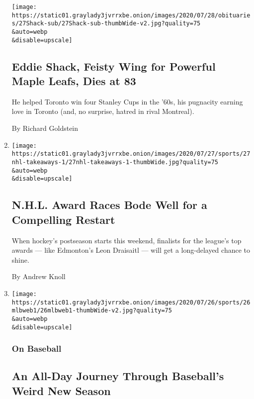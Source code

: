 \begin{enumerate}
  \texttt{[image: https://static01.graylady3jvrrxbe.onion/images/2020/07/28/obituaries/27Shack-sub/27Shack-sub-thumbWide-v2.jpg?quality=75\\\&auto=webp\\\&disable=upscale]}

  \hypertarget{eddie-shack-feisty-wing-for-powerful-maple-leafs-dies-at-83}{%
  \subsection{Eddie Shack, Feisty Wing for Powerful Maple Leafs, Dies at
  83}\label{eddie-shack-feisty-wing-for-powerful-maple-leafs-dies-at-83}}

  He helped Toronto win four Stanley Cups in the '60s, his pugnacity
  earning love in Toronto (and, no surprise, hatred in rival Montreal).

  By Richard Goldstein
\item
  \href{/2020/07/27/sports/hockey/nhl-awards-restart-postseason.html}{}

  \texttt{[image: https://static01.graylady3jvrrxbe.onion/images/2020/07/27/sports/27nhl-takeaways-1/27nhl-takeaways-1-thumbWide.jpg?quality=75\\\&auto=webp\\\&disable=upscale]}

  \hypertarget{nhl-award-races-bode-well-for-a-compelling-restart}{%
  \subsection{N.H.L. Award Races Bode Well for a Compelling
  Restart}\label{nhl-award-races-bode-well-for-a-compelling-restart}}

  When hockey's postseason starts this weekend, finalists for the
  league's top awards --- like Edmonton's Leon Draisaitl --- will get a
  long-delayed chance to shine.

  By Andrew Knoll
\item
  \href{/2020/07/26/sports/baseball/mlb-season.html}{}

  \texttt{[image: https://static01.graylady3jvrrxbe.onion/images/2020/07/26/sports/26mlbweb1/26mlbweb1-thumbWide-v2.jpg?quality=75\\\&auto=webp\\\&disable=upscale]}

  \hypertarget{on-baseball-1}{%
  \subsubsection{On Baseball}\label{on-baseball-1}}

  \hypertarget{an-all-day-journey-through-baseballs-weird-new-season}{%
  \subsection{An All-Day Journey Through Baseball's Weird New
  Season}\label{an-all-day-journey-through-baseballs-weird-new-season}}


\end{enumerate}
